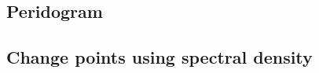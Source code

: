 \documentclass{article}
\begin{document}
\subsection{Peridogram}
\subsection{Change points using spectral density}



\end{document}
